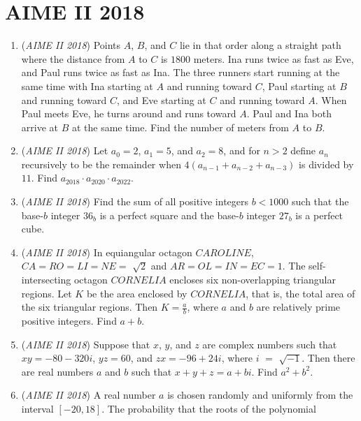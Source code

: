 \section{AIME II 2018}
        \begin{enumerate}
        	\item (\textit{AIME II 2018}) Points $A$, $B$, and $C$ lie in that order along a straight path where the distance from $A$ to $C$ is $1800$ meters. Ina runs twice as fast as Eve, and Paul runs twice as fast as Ina. The three runners start running at the same time with Ina starting at $A$ and running toward $C$, Paul starting at $B$ and running toward $C$, and Eve starting at $C$ and running toward $A$. When Paul meets Eve, he turns around and runs toward $A$. Paul and Ina both arrive at $B$ at the same time. Find the number of meters from $A$ to $B$.


 

	\item (\textit{AIME II 2018}) Let $a_{0} = 2$, $a_{1} = 5$, and $a_{2} = 8$, and for $n > 2$ define $a_{n}$ recursively to be the remainder when $4(a_{n-1} + a_{n-2} + a_{n-3})$ is divided by $11$. Find $a_{2018} \cdot a_{2020} \cdot a_{2022}$.


 

	\item (\textit{AIME II 2018}) Find the sum of all positive integers $b < 1000$ such that the base-$b$ integer $36_{b}$ is a perfect square and the base-$b$ integer $27_{b}$ is a perfect cube.


 

	\item (\textit{AIME II 2018}) In equiangular octagon $CAROLINE$, $CA = RO = LI = NE =$ $\sqrt{2}$ and $AR = OL = IN = EC = 1$. The self-intersecting octagon $CORNELIA$ encloses six non-overlapping triangular regions. Let $K$ be the area enclosed by $CORNELIA$, that is, the total area of the six triangular regions. Then $K = \frac{a}{b}$, where $a$ and $b$ are relatively prime positive integers. Find $a + b$.


 

	\item (\textit{AIME II 2018}) Suppose that $x$, $y$, and $z$ are complex numbers such that $xy = -80 - 320i$, $yz = 60$, and $zx = -96 + 24i$, where $i$ $=$ $\sqrt{-1}$. Then there are real numbers $a$ and $b$ such that $x + y + z = a + bi$. Find $a^2 + b^2$.


 

	\item (\textit{AIME II 2018}) A real number $a$ is chosen randomly and uniformly from the interval $[-20, 18]$. The probability that the roots of the polynomial



\end{enumerate}

